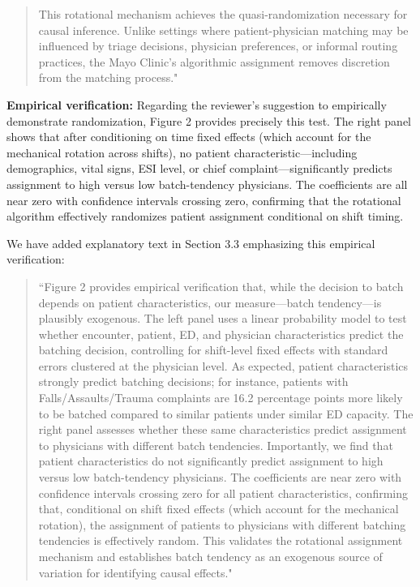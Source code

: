 \documentclass[11pt]{article}
\newcommand{\1}{\hbox{\rm 1\kern-.35em 1}}
\begin{document}
{\begin{quote}
This rotational mechanism achieves the quasi-randomization necessary for causal inference. Unlike settings where patient-physician matching may be influenced by triage decisions, physician preferences, or informal routing practices, the Mayo Clinic's algorithmic assignment removes discretion from the matching process."
\end{quote}

\textbf{Empirical verification:} Regarding the reviewer's suggestion to empirically demonstrate randomization, Figure 2 provides precisely this test. The right panel shows that after conditioning on time fixed effects (which account for the mechanical rotation across shifts), no patient characteristic—including demographics, vital signs, ESI level, or chief complaint—significantly predicts assignment to high versus low batch-tendency physicians. The coefficients are all near zero with confidence intervals crossing zero, confirming that the rotational algorithm effectively randomizes patient assignment conditional on shift timing.

We have added explanatory text in Section 3.3 emphasizing this empirical verification:

\begin{quote}
``Figure 2 provides empirical verification that, while the decision to batch depends on patient characteristics, our measure—batch tendency—is plausibly exogenous. The left panel uses a linear probability model to test whether encounter, patient, ED, and physician characteristics predict the batching decision, controlling for shift-level fixed effects with standard errors clustered at the physician level. As expected, patient characteristics strongly predict batching decisions; for instance, patients with Falls/Assaults/Trauma complaints are 16.2 percentage points more likely to be batched compared to similar patients under similar ED capacity. The right panel assesses whether these same characteristics predict assignment to physicians with different batch tendencies. Importantly, we find that patient characteristics do not significantly predict assignment to high versus low batch-tendency physicians. The coefficients are near zero with confidence intervals crossing zero for all patient characteristics, confirming that, conditional on shift fixed effects (which account for the mechanical rotation), the assignment of patients to physicians with different batching tendencies is effectively random. This validates the rotational assignment mechanism and establishes batch tendency as an exogenous source of variation for identifying causal effects."
\end{quote}

}
\end{document}
